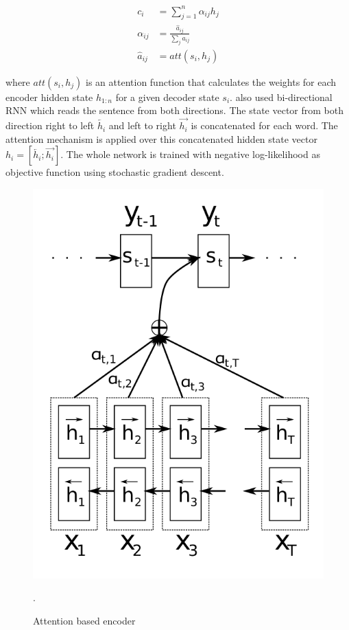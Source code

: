 \begin{align*}
c_i &= \sum_{j=1}^{n} \alpha_{ij} h_j \\
\alpha_{ij} &= \frac{\hat{a}_{ij}}{\sum_j \hat{a}_{ij}}\\
\hat{a}_{ij} &= att(s_i, h_j)
\end{align*}

where $att(s_i, h_j)$ is an attention function that calculates the weights for each encoder hidden state $h_{1:n}$ for a given decoder state $s_i$. \cite{bahdanau2014neural} also used bi-directional RNN which reads the sentence from both directions. The state vector from both direction right to left  $\overleftarrow{h_i}$ and left to right $\overrightarrow{h_i}$ is concatenated for each word. The attention mechanism is applied over this concatenated hidden state vector $h_i = [\overleftarrow{h_i};\overrightarrow{h_i}]$. The whole network is trained with negative log-likelihood as objective function using stochastic gradient descent.


\begin{figure}[ht]
	\centering
	\includegraphics[scale=0.4]{images/attention}
	\caption{Attention based encoder \citep{bahdanau2014neural}}.
	\label{attention}
\end{figure}

